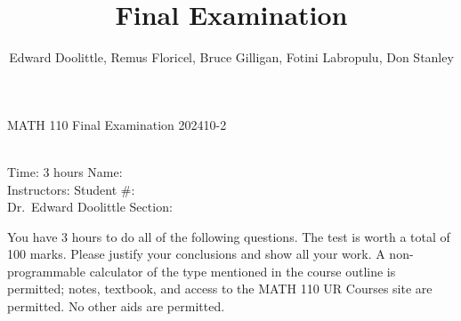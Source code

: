 \documentclass[12pt]{article}
\title{Final Examination}
\author{Edward Doolittle, Remus Floricel, Bruce Gilligan, Fotini Labropulu, Don Stanley}
\begin{document}
\thispagestyle{plain}

\begin{center}
  \LARGE{MATH 110 Final Examination 202410-2}
\end{center}

\begin{flushleft}
\quad\\
Time:  3 hours                  \hfill       Name: \underline{\hspace{2in}}  \\
Instructors:                    \hfill Student \#: \underline{\hspace{2in}}  \\
\quad Dr.~Edward Doolittle      \hfill    Section: \underline{\hspace{2in}}  \\
\end{flushleft}


\noindent
You have 3 hours to do all of the following questions.
The test is worth a total of 100 marks.
Please justify your conclusions and
show all your work.
A non-programmable calculator of the type mentioned in the course outline
is permitted; notes, textbook, and access to the MATH 110 UR Courses site are
permitted.  No other aids are permitted.
\end{document}
